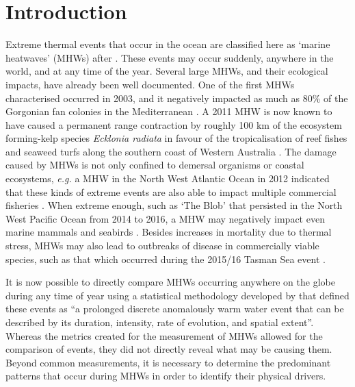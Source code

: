 \documentclass[utf8]{frontiersSCNS}
\begin{document}
\section{Introduction}
Extreme thermal events that occur in the ocean are classified here as `marine heatwaves' (MHWs) after \citet{Hobday2016}. These events may occur suddenly, anywhere in the world, and at any time of the year. Several large MHWs, and their ecological impacts, have already been well documented. One of the first MHWs characterised occurred in 2003, and it negatively impacted as much as 80\% of the Gorgonian fan colonies in the Mediterranean \citep{Garrabou2009}. A 2011 MHW is now known to have caused a permanent range contraction by roughly 100 km of the ecosystem forming-kelp species \emph{Ecklonia radiata} in favour of the tropicalisation of reef fishes and seaweed turfs along the southern coast of Western Australia \citep{Wernberg2016}. The damage caused by MHWs is not only confined to demersal organisms or coastal ecosystems, \emph{e.g.} a MHW in the North West Atlantic Ocean in 2012 indicated that these kinds of extreme events are also able to impact multiple commercial fisheries \citep{Mills2013}. When extreme enough, such as `The Blob' that persisted in the North West Pacific Ocean from 2014 to 2016, a MHW may negatively impact even marine mammals and seabirds \citep{Cavole2016}. Besides increases in mortality due to thermal stress, MHWs may also lead to outbreaks of disease in commercially viable species, such as that which occurred during the 2015/16 Tasman Sea event \citep{Oliver2017}.

It is now possible to directly compare MHWs occurring anywhere on the globe during any time of year using a statistical methodology developed by \citet{Hobday2016} that defined these events as ``a prolonged discrete anomalously warm water event that can be described by its duration, intensity, rate of evolution, and spatial extent''. Whereas the metrics created for the measurement of MHWs allowed for the comparison of events, they did not directly reveal what may be causing them. Beyond common measurements, it is necessary to determine the predominant patterns that occur during MHWs in order to identify their physical drivers.
\end{document}
